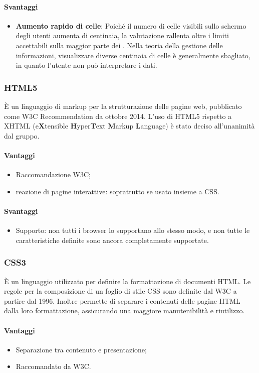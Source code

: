 \paragraph{Svantaggi}
\begin{itemize}
\item \textbf{Aumento rapido di celle}: Poiché il numero di celle visibili sullo schermo degli utenti aumenta di centinaia, la valutazione rallenta oltre i limiti accettabili sulla maggior parte dei . Nella teoria della gestione delle informazioni, visualizzare diverse centinaia di celle è generalmente sbagliato, in quanto l'utente non può interpretare i dati. 
\end{itemize}

\subsubsection{HTML5}
È un linguaggio di markup per la strutturazione delle pagine web, pubblicato come W3C Recommendation da ottobre 2014. L’uso di HTML5 rispetto a XHTML
(e\textbf{X}tensible \textbf{H}yper\textbf{T}ext \textbf{M}arkup \textbf{L}anguage) è stato deciso all'unanimità dal gruppo.

\paragraph{Vantaggi}
\begin{itemize}
\item Raccomandazione W3C;
\item reazione di pagine interattive: soprattutto se usato insieme a CSS.
\end{itemize}

\paragraph{Svantaggi}
\begin{itemize}
\item Supporto: non tutti i browser lo supportano allo stesso modo, e non tutte le caratteristiche definite sono ancora completamente supportate.
\end{itemize}

\subsubsection{CSS3}
È un linguaggio utilizzato per definire la formattazione di documenti HTML.
Le regole per la composizione di un foglio di stile CSS sono definite dal W3C
a partire dal 1996. Inoltre permette di separare i contenuti delle pagine HTML dalla loro formattazione, assicurando una maggiore manutenibilità e riutilizzo.

\paragraph{Vantaggi}
\begin{itemize}
\item Separazione tra contenuto e presentazione;
\item Raccomandato da W3C.
\end{itemize}
